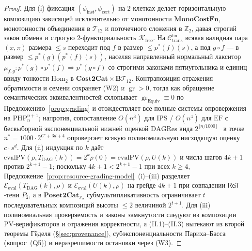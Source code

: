 \documentclass[11pt]{article}
\theoremstyle{plain}
\theoremstyle{definition}
\newcommand{\Hom}{\mathrm{Hom}}
\newcommand{\gr}{\operatorname{gr}}
\begin{document}
\begin{proof}
Для (i) фиксация $(\phi_{\mathrm{inst}}, \phi_{\mathrm{cert}})$ на $2$-клетках делает горизонтальную композицию зависящей исключительно от монотонности $\mathbf{MonoCostFn}$, монотонности объединения в $\mathcal{T}_{12}$ и поточечного сложения в $\mathbb{Z}_2$, давая строгий закон обмена и строгую $2$-функториальность $\mathcal{K}_{\mathrm{free}}$. На $\mathcal{C}_{\mathrm{trans}}^{\mathrm{fin}}$ всякая валидная пара $(x,\pi)$ размера $\le s$ переходит под $f$ в размер $\le p^*(f)(s)$, а под $g \circ f$ — в размер $\le p^*(g)(p^*(f)(s))$, населяя направленный нормальный лакситор $\mu_{f,g} : p^*(g)\circ p^*(f) \Rightarrow p^*(g\circ f)$ со строгими законами пятиугольника и единиц ввиду тонкости $\Hom_2$ в $\mathbf{Cost2Cat} \times \mathbf{B}\mathcal{T}_{12}$. Контрапозиция отражения обратимости и семени сохраняет \textup{(W2)} и $\gr > 0$, тогда как обращение семантических эквивалентностей схлопывает $\gr_{\mathrm{Equiv}} \equiv 0$ по Предложению~\ref{prop:grading} и отождествляет все полные системы опровержения на $\mathrm{PHP}_n^{n+1}$; напротив, сопоставление $O(n^3)$ для $\mathrm{IPS}$ / $O(n^4)$ для $\mathrm{EF}$ с бесвыборной экспоненциальной нижней оценкой $\mathrm{DAGRes}$ вида $2^{\lfloor n/1000\rfloor}$~\cite{Haken1985} в точке $n^* = 1000 \cdot 2^{C' + 3d + 4}$ опровергает всякую полиномиальную нисходящую оценку $c\cdot s^d$. Для (ii) индукция по $k$ даёт $\mathrm{evalPV}(\rho, T_{\mathrm{DAG}}(k)) = 2^k\rho(0) = \mathrm{evalPV}(\rho, U(k))$ и числа шагов $4k+1$ против $2^{k+1}-1$; поскольку $4k+1 < 2^{k+1}-1$ при всех $k \ge 4$, Предложение~\ref{prop:resource-grading-model}~(i)--(iii) разделяет $\mathcal{E}_{\mathrm{eval}}(T_{\mathrm{DAG}}(k), \rho)$ и $\mathcal{E}_{\mathrm{eval}}(U(k), \rho)$ на грейде $4k+1$ при совпадении $\mathsf{Reif}$-тени $P_2$, а в $\mathbf{Poset2Cat}_{\mathbb{Z}_2}$ субмультипликативность ограничивает $t$ последовательных композиций высоты $\le 2$ величиной $2^{t+1}$. Для (iii) полиномиальная проверяемость и законы замкнутости следуют из композиции $\mathrm{PV}$-верификаторов и отражения корректности, а (II.1)--(II.3) вытекают из второй теоремы Гёделя (\S\ref{sec:provenance}), субэкспоненциальности Париха--Басса (вопрос~(Q5)) и неразрешимости остановки через \textup{(W3)}.
\end{proof}
\end{document}

